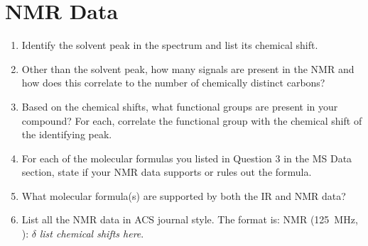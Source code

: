 \documentclass[titlepage]{article}
\begin{document}
\section*{ NMR Data}
\begin{enumerate}
    \item Identify the solvent peak in the spectrum and list its chemical shift.
    \item Other than the solvent peak, how many signals are present in the  NMR and how does this correlate to the number of chemically distinct carbons?
    \item Based on the chemical shifts, what functional groups are present in your compound? For each, correlate the functional group with the chemical shift of the identifying peak.
    \item For each of the molecular formulas you listed in Question 3 in the MS Data section, state if your  NMR data supports or rules out the formula.
    \item What molecular formula(s) are supported by both the IR and  NMR data?
    \item List all the  NMR data in ACS journal style. The format is:  NMR (\SI{125}{\mega\hertz}, ): $\delta$ \emph{list chemical shifts here}.
\end{enumerate}
\end{document}

